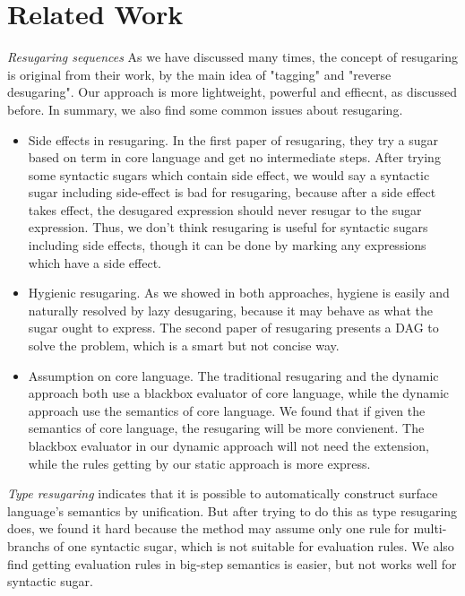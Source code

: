 \section{Related Work}
\label{sec5}

\emph{Resugaring sequences }\cite{resugaring,hygienic} As we have discussed many times, the concept of resugaring is original from their work, by the main idea of "tagging" and "reverse desugaring". Our approach is more lightweight, powerful and effiecnt, as discussed before. In summary, we also find some common issues about resugaring.
\begin{itemize}
\item Side effects in resugaring.\label{mark:side} In the first paper of resugaring, they try a  sugar based on  term in core language and get no intermediate steps. After trying some syntactic sugars which contain side effect, we would say a syntactic sugar including side-effect is bad for resugaring, because after a side effect takes effect, the desugared expression should never resugar to the sugar expression. Thus, we don't think resugaring is useful for syntactic sugars  including side effects, though it can be done by marking any expressions which have a side effect.
\item Hygienic resugaring. As we showed in both approaches, hygiene is easily and naturally resolved by lazy desugaring, because it may behave as what the sugar ought to express. The second paper of resugaring presents a DAG to solve the problem, which is a smart but not concise way.
\item Assumption on core language. The traditional resugaring and the dynamic approach both use a blackbox evaluator of core language, while the dynamic approach use the semantics of core language. We found that if given the semantics of core language, the resugaring will be more convienent. The blackbox evaluator in our dynamic approach will not need the extension, while the rules getting by our static approach is more express. 
\end{itemize}

\emph{Type resugaring} \cite{resugaringtype} indicates that it is possible to automatically construct surface language's semantics by unification. But after trying to do this as type resugaring does, we found it hard because the method may assume only one rule for multi-branchs of one syntactic sugar, which is not suitable for evaluation rules. We also find getting evaluation rules in big-step semantics is easier, but not works well for syntactic sugar.




